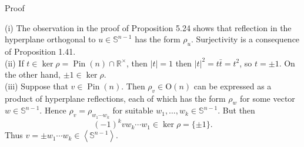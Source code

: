 \documentclass[10pt, letterpaper]{article}
\begin{document}
Proof

(i) The observation in the proof of Proposition 5.24 shows that reflection in the hyperplane orthogonal to $u \in \mathbb{S}^{n-1}$ has the form $\rho_{u}$. Surjectivity is a consequence of Proposition 1.41.\\

(ii) If $t \in \operatorname{ker} \rho=\operatorname{Pin}(n) \cap \mathbb{R}^{\times}$, then $|t|=1$ then $|t|^{2}=t \bar{t}=t^{2}$, so $t= \pm 1$. On the other hand, $\pm 1 \in \operatorname{ker} \rho$.\\

(iii) Suppose that $v \in \operatorname{Pin}(n)$. Then $\rho_{v} \in \mathrm{O}(n)$ can be expressed as a product of hyperplane reflections, each of which has the form $\rho_{w}$ for some vector $w \in \mathbb{S}^{n-1}$. Hence $\rho_{v}=\rho_{w_{1} \cdots w_{k}}$ for suitable $w_{1}, \ldots, w_{k} \in \mathbb{S}^{n-1}$. But then
$$
(-1)^{k} v w_{k} \cdots w_{1} \in \operatorname{ker} \rho=\{ \pm 1\} .
$$
Thus $v= \pm w_{1} \cdots w_{k} \in\left\langle\mathbb{S}^{n-1}\right\rangle$.
\end{document}
